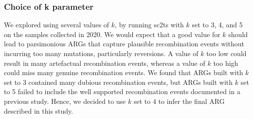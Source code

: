 \documentclass[12pt]{article}
\begin{document}




\subsubsection*{Choice of k parameter}

We explored using several values of $k$,
by running sc2ts with $k$ set to 3, 4, and 5
on the samples collected in 2020.
We would expect that a good value for $k$
should lead to parsimonious ARGs
that capture plausible recombination events
without incurring too many mutations, particularly reversions.
A value of $k$ too low could result in many artefactual recombination events,
whereas a value of $k$ too high could miss many genuine recombination events.
We found that ARGs built with $k$ set to 3
contained many dubious recombination events,
but ARGs built with $k$ set to 5 failed
to include the well supported recombination events documented
in a previous study\cite{Jackson2021}.
Hence, we decided to use $k$ set to 4
to infer the final ARG described in this study.
\end{document}
